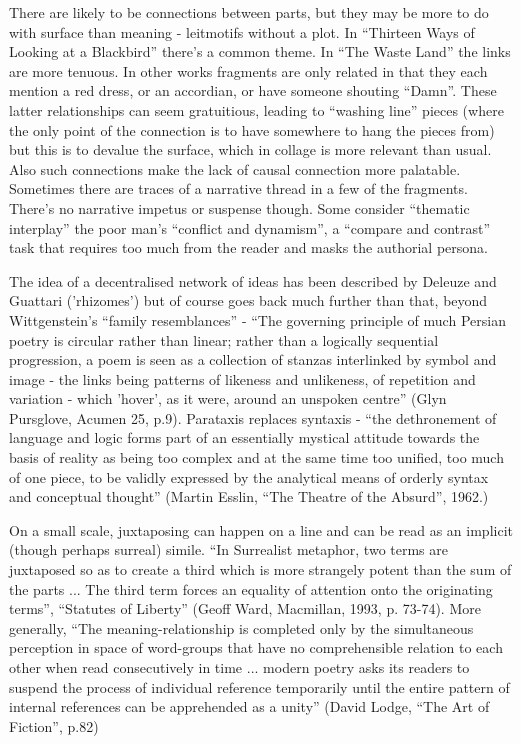 \documentclass[11pt]{article}
\begin{document}
There are likely to be connections between parts, but they may be more to do with surface than meaning - leitmotifs without a plot. In ``Thirteen Ways of Looking at a Blackbird'' there's a common theme. In ``The Waste Land'' the links are more tenuous. In other works fragments are only related in that they each mention a red dress, or an accordian, or have someone shouting ``Damn''. These latter relationships can seem gratuitious, leading to ``washing line'' pieces (where the only point of the connection is to have somewhere to hang the pieces from) but this is to devalue the surface, which in collage is more relevant than usual. Also such connections make the lack of causal connection more palatable. Sometimes there are traces of a narrative thread in a few of the fragments. There's no narrative impetus or suspense though. Some consider ``thematic interplay'' the poor man's ``conflict and dynamism'', a ``compare and contrast'' task that requires too much from the reader and masks the authorial persona.

The idea of a decentralised network of ideas has been described by Deleuze and Guattari ('rhizomes') but of course goes back much further than that, beyond Wittgenstein's ``family resemblances'' - ``The governing principle of much Persian poetry is circular rather than linear; rather than a logically sequential progression, a poem is seen as a collection of stanzas interlinked by symbol and image - the links being patterns of likeness and unlikeness, of repetition and variation - which 'hover', as it were, around an unspoken centre'' (Glyn Pursglove, Acumen 25, p.9). Parataxis replaces syntaxis - ``the dethronement of language and logic forms part of an essentially mystical attitude towards the basis of reality as being too complex and at the same time too unified, too much of one piece, to be validly expressed by the analytical means of orderly syntax and conceptual thought'' (Martin Esslin, ``The Theatre of the Absurd'', 1962.)

On a small scale, juxtaposing can happen on a line and can be read as an implicit (though perhaps surreal) simile. ``In Surrealist metaphor, two terms are juxtaposed so as to create a third which is more strangely potent than the sum of the parts ... The third term forces an equality of attention onto the originating terms'', ``Statutes of Liberty'' (Geoff Ward, Macmillan, 1993, p. 73-74). More generally, ``The meaning-relationship is completed only by the simultaneous perception in space of word-groups that have no comprehensible relation to each other when read consecutively in time ... modern poetry asks its readers to suspend the process of individual reference temporarily until the entire pattern of internal references can be apprehended as a unity'' (David Lodge, ``The Art of Fiction'', p.82)
\end{document}
